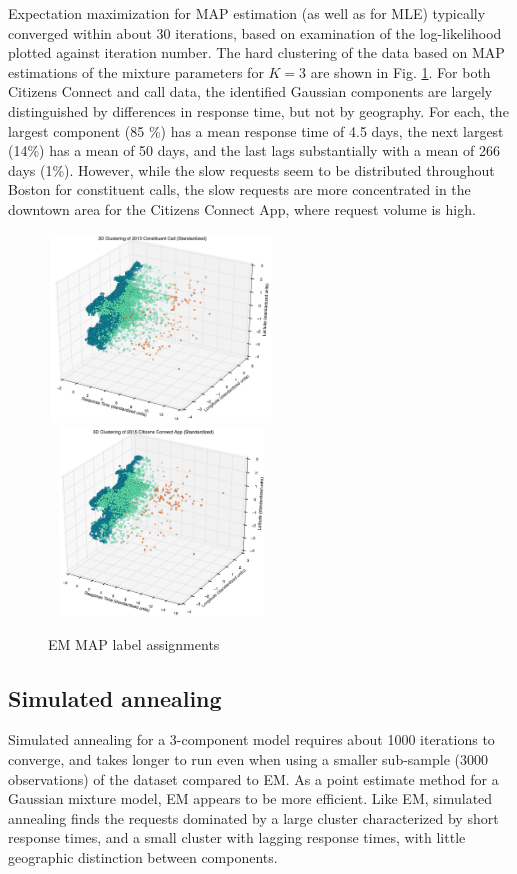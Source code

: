 \documentclass[twoside]{article}
\theoremstyle{theorem}
\theoremstyle{theorem}
\theoremstyle{theorem}
\theoremstyle{lemma}
\theoremstyle{definition}
\theoremstyle{example}
\begin{document}
Expectation maximization for MAP estimation (as well as for MLE) typically converged within about 30 iterations, based on examination of the log-likelihood plotted against iteration number. The hard clustering of the data based on MAP estimations of the mixture parameters for $K=3$ are shown in Fig. \ref{EMlabels}. For both Citizens Connect and call data, the identified Gaussian components are largely distinguished by differences in response time, but not by geography. For each, the largest component (85 \%) has a mean response time of 4.5 days, the next largest (14\%) has a mean of 50 days, and the last lags substantially with a mean of 266 days (1\%). However, while the slow requests seem to be distributed throughout Boston for constituent calls, the slow requests are more concentrated in the downtown area for the Citizens Connect App, where request volume is high.
\begin{figure}[h!]
\begin{center}
\includegraphics[width=60mm, height=50mm]{3D_call}
\includegraphics[width=60mm, height=50mm]{3D_app}
\caption{EM MAP label assignments}
\label{EMlabels}
\end{center}
\end{figure}

\subsection{Simulated annealing}
Simulated annealing for a 3-component model requires about 1000 iterations to converge, and takes longer to run even when using a smaller sub-sample (3000 observations) of the dataset compared to EM. As a point estimate method for a Gaussian mixture model, EM appears to be more efficient. Like EM, simulated annealing finds the requests dominated by a large cluster characterized by short response times, and a small cluster with lagging response times, with little geographic distinction between components. 
\end{document}
